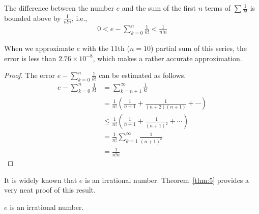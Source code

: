 \documentclass[thmcnt=section, 12pt]{elegantbook}
\begin{document}
\begin{theorem} \label{thm:5}
    The difference between the number $e$ and the sum of the first $n$ terms of $\sum \frac{1}{k!}$ is bounded above by $\frac{1}{n! n}$, i.e., 
    \begin{align*}
        0 < e - \sum_{k=0}^{n} \frac{1}{k!} < \frac{1}{n! n}
    \end{align*}
\end{theorem}

\begin{remark}
    When we approximate $e$ with the $11$th ($n = 10$) partial sum of this series, the error is less than $2.76 \times 10^{-8}$, which makes a rather accurate approximation. 
\end{remark}

\begin{proof}
    The error $e - \sum_{k=0}^{n} \frac{1}{k!}$ can be estimated as follows.
    \begin{align*}
        e - \sum_{k=0}^{n} \frac{1}{k!}
        &= \sum_{k=n+1}^{\infty} \frac{1}{k!} \\ 
        &= \frac{1}{n!} \left(\frac{1}{n+1} + \frac{1}{(n+2)(n+1)} + \cdots\right) \\ 
        &\leq \frac{1}{n!} \left(\frac{1}{n+1} + \frac{1}{(n+1)^2} + \cdots\right) \\
        &= \frac{1}{n!} \sum_{k=1}^\infty \frac{1}{(n+1)^k} \\
        &= \frac{1}{n! n}
    \end{align*}
\end{proof}


\par It is widely known that $e$ is an irrational number. Theorem~\ref{thm:5} provides a very neat proof of this result.

\begin{theorem}
    $e$ is an irrational number.
\end{theorem}
\end{document}
